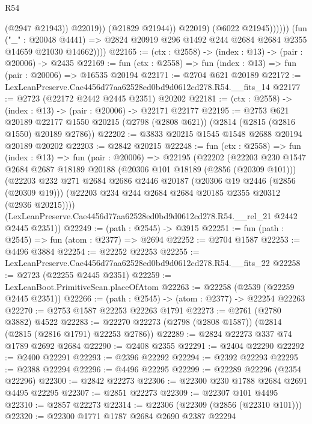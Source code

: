 \begin{lexlean}{R54}
\begin{coremodule}
                              (@2947 @21943))
                            @22019))
                        (@21829 @21944))
                      @22019)
                    (@6022 @21945))))))
          (fun ("_" : @20048 @4441) =>
          @2824 @20919 @296 @1492 @244 @2684 @2684 @2355 @14659 @21030 @14662))))
@22165 := (ctx : @2558) -> (index : @13) -> (pair : @20006) -> @2435
@22169 := fun (ctx : @2558) => fun (index : @13) => fun (pair : @20006) => @16535 @20194
@22171 := @2704 @621 @20189
@22172 := LexLeanPreserve.Cae4456d77aa62528ed0bd9d0612cd278.R54.__fits_14
@22177 := @2723 (@22172 @2442 @2445 @2351) @20202
@22181 := (ctx : @2558) -> (index : @13) -> (pair : @20006) -> @22171 @22177
@22195 := @2753
    @621
    @20189
    @22177
    @1550
    @20215
    (@2798 (@2808 @621))
    (@2814 (@2815 (@2816 @1550) @20189 @2786))
@22202 := @3833 @20215 @1545 @1548 @2688 @20194 @20189 @20202
@22203 := @2842 @20215
@22248 := fun (ctx : @2558) =>
  fun (index : @13) =>
  fun (pair : @20006) =>
  @22195
    (@22202
      (@22203
        @230
        @1547
        @2684
        @2687
        @18189
        @20188
        (@20306 @101 @18189 (@2856 (@20309 @101)))
        (@22203
          @232
          @271
          @2684
          @2686
          @2446
          @20187
          (@20306 @19 @2446 (@2856 (@20309 @19)))
          (@22203 @234 @244 @2684 @2684 @20185 @2355 @20312 (@2936 @20215))))
      (LexLeanPreserve.Cae4456d77aa62528ed0bd9d0612cd278.R54.__rel_21 @2442 @2445 @2351))
@22249 := (path : @2545) -> @3915
@22251 := fun (path : @2545) => fun (atom : @2377) => @2694
@22252 := @2704 @1587
@22253 := @4496 @3884
@22254 := @22252 @22253
@22255 := LexLeanPreserve.Cae4456d77aa62528ed0bd9d0612cd278.R54.__fits_22
@22258 := @2723 (@22255 @2445 @2351)
@22259 := LexLeanBoot.PrimitiveScan.placeOfAtom
@22263 := @22258 (@2539 (@22259 @2445 @2351))
@22266 := (path : @2545) -> (atom : @2377) -> @22254 @22263
@22270 := @2753 @1587 @22253 @22263 @1791
@22273 := @2761 (@2780 @3882) @4522
@22283 := @22270 @22273 (@2798 (@2808 @1587)) (@2814 (@2815 (@2816 @1791) @22253 @2786))
@22289 := @2824 @22273 @337 @74 @1789 @2692 @2684
@22290 := @2408 @2355
@22291 := @2404 @22290
@22292 := @2400 @22291
@22293 := @2396 @22292
@22294 := @2392 @22293
@22295 := @2388 @22294
@22296 := @4496 @22295
@22299 := @22289 @22296 (@2354 @22296)
@22300 := @2842 @22273
@22306 := @22300 @230 @1788 @2684 @2691 @4495 @22295
@22307 := @2851 @22273
@22309 := @22307 @101 @4495
@22310 := @2857 @22273
@22314 := @22306 (@22309 (@2856 (@22310 @101)))
@22320 := @22300 @1771 @1787 @2684 @2690 @2387 @22294

\end{coremodule}
\end{lexlean}

